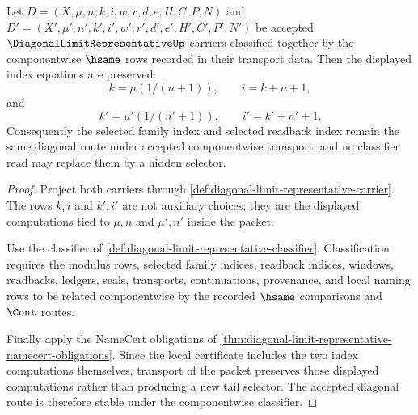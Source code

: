 \begin{theorem}
\label{thm:diagonal-limit-representative-index-stability}
Let $D=(X,\mu,n,k,i,w,r,d,e,H,C,P,N)$ and $D'=(X',\mu',n',k',i',w',r',d',e',H',C',P',N')$ be accepted $\DiagonalLimitRepresentativeUp$ carriers classified together by the componentwise $\hsame$ rows recorded in their transport data. Then the displayed index equations are preserved:
$$
k=\mu(1/(n+1)),\qquad i=k+n+1,
$$
and
$$
k'=\mu'(1/(n'+1)),\qquad i'=k'+n'+1.
$$
Consequently the selected family index and selected readback index remain the same diagonal route under accepted componentwise transport, and no classifier read may replace them by a hidden selector.
\end{theorem}
\begin{proof}
Project both carriers through \autoref{def:diagonal-limit-representative-carrier}. The rows $k,i$ and $k',i'$ are not auxiliary choices; they are the displayed computations tied to $\mu,n$ and $\mu',n'$ inside the packet.

Use the classifier of \autoref{def:diagonal-limit-representative-classifier}. Classification requires the modulus rows, selected family indices, readback indices, windows, readbacks, ledgers, seals, transports, continuations, provenance, and local naming rows to be related componentwise by the recorded $\hsame$ comparisons and $\Cont$ routes.

Finally apply the NameCert obligations of \autoref{thm:diagonal-limit-representative-namecert-obligations}. Since the local certificate includes the two index computations themselves, transport of the packet preserves those displayed computations rather than producing a new tail selector. The accepted diagonal route is therefore stable under the componentwise classifier.
\end{proof}

